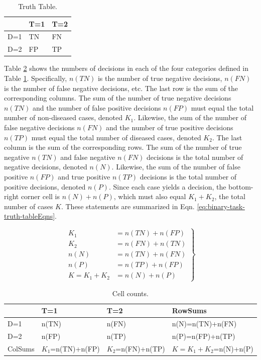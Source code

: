 \documentclass[
]{book}
\begin{document}
\begin{table}

\caption{\label{tab:binary-task-truth-table}Truth Table.}
\centering
\begin{tabular}[t]{l|l|l}
\hline
  & T=1 & T=2\\
\hline
D=1 & TN & FN\\
\hline
D=2 & FP & TP\\
\hline
\end{tabular}
\end{table}

Table \ref{tab:binary-task-truth-table2} shows the numbers of decisions in each of the four categories defined in Table \ref{tab:binary-task-truth-table}. Specifically, \(n(TN)\) is the number of true negative decisions, \(n(FN)\) is the number of false negative decisions, etc. The last row is the sum of the corresponding columns. The sum of the number of true negative decisions \(n(TN)\) and the number of false positive decisions \(n(FP)\) must equal the total number of non-diseased cases, denoted \(K_1\). Likewise, the sum of the number of false negative decisions \(n(FN)\) and the number of true positive decisions \(n(TP)\) must equal the total number of diseased cases, denoted \(K_2\). The last column is the sum of the corresponding rows. The sum of the number of true negative \(n(TN)\) and false negative \(n(FN)\) decisions is the total number of negative decisions, denoted \(n(N)\). Likewise, the sum of the number of false positive \(n(FP)\) and true positive \(n(TP)\) decisions is the total number of positive decisions, denoted \(n(P)\). Since each case yields a decision, the bottom-right corner cell is \(n(N) + n(P)\), which must also equal \(K_1+K_2\), the total number of cases \(K\). These statements are summarized in Eqn. \eqref{eq:binary-task-truth-tableEqns}.

\begin{equation} 
\left.\begin{aligned}
K_1&=n(TN)+n(FP)\\ 
K_2&=n(FN)+n(TN)\\ 
n(N)&=n(TN)+n(FN)\\ 
n(P)&=n(TP)+n(FP)\\
K=K_1+K_2&=n(N)+n(P)
\end{aligned}\right\}
\label{eq:binary-task-truth-tableEqns}
\end{equation}

\begin{table}

\caption{\label{tab:binary-task-truth-table2}Cell counts.}
\centering
\begin{tabular}[t]{l|l|l|l}
\hline
  & T=1 & T=2 & RowSums\\
\hline
D=1 & n(TN) & n(FN) & n(N)=n(TN)+n(FN)\\
\hline
D=2 & n(FP) & n(TP) & n(P)=n(FP)+n(TP)\\
\hline
ColSums & $K_1$=n(TN)+n(FP) & $K_2$=n(FN)+n(TP) & $K=K_1+K_2$=n(N)+n(P)\\
\hline
\end{tabular}
\end{table}
\end{document}
